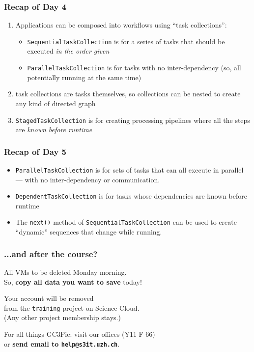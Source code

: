 \documentclass[english,serif,mathserif,xcolor=pdftex,dvipsnames,table]{beamer}
\begin{document}
\begin{frame}
  \frametitle{Recap of Day 4}

  \begin{enumerate}
  \item Applications can be composed into workflows using ``task collections'':
    \begin{itemize}
    \item \texttt{SequentialTaskCollection} is for a series of tasks that should
      be executed \emph{in the order given}
    \item \texttt{ParallelTaskCollection} is for tasks with no inter-dependency
      (so, all potentially running at the same time)
    \end{itemize}

  \item task collections are tasks themselves, so collections can be nested to
    create any kind of directed graph

  \item \texttt{StagedTaskCollection} is for creating processing pipelines where
    all the steps are \emph{known before runtime}
  \end{enumerate}
\end{frame}


\begin{frame}
  \frametitle{Recap of Day 5}

  \begin{itemize}
  \item \texttt{ParallelTaskCollection} is for sets of tasks that can all
    execute in parallel --- with no inter-dependency or communication.
  \item \texttt{DependentTaskCollection} is for tasks whose dependencies are
    known before runtime
  \item The \texttt{next()} method of \texttt{SequentialTaskCollection} can be
    used to create ``dynamic'' sequences that change while running.
  \end{itemize}

\end{frame}


\begin{frame}
  \frametitle{...and after the course?}
  \centering

  All VMs to be deleted Monday morning. \\
  So, \textbf{copy all data you want to save} today!

  \+ 
  Your account will be removed \\
  from the \texttt{training} project on Science Cloud. \\
  (Any other project membership stays.)

  \+
  For all things GC3Pie: visit our offices (Y11 F 66) \\
  or \textbf{send email to \texttt{help@s3it.uzh.ch}}.
\end{frame}
\end{document}
